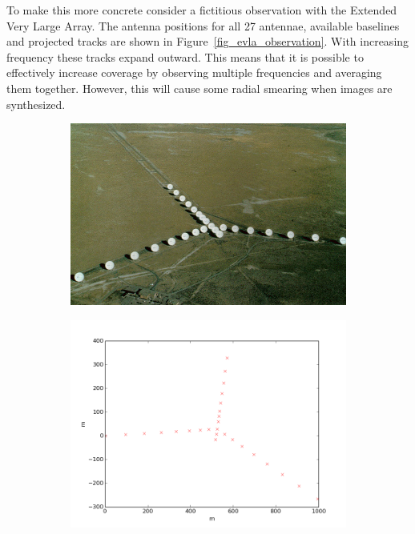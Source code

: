 \documentclass[a4paper,10pt]{report}
\begin{document}
To make this more concrete consider a fictitious observation with the Extended Very Large Array. The antenna 
positions for all 27 antennae, available baselines and projected tracks are shown in Figure~\ref{fig_evla_observation}. With
increasing frequency these tracks expand outward. This means that it is possible to effectively increase coverage
by observing multiple frequencies and averaging them together. However, this will cause some radial smearing when
images are synthesized.

\begin{figure}[h]
 \begin{mdframed}
 \centering
 \begin{subfigure}[b]{0.3\textwidth}
  \includegraphics[width=\textwidth]{images/vla.jpg}
  \caption{}
 \end{subfigure}
 \begin{subfigure}[b]{0.3\textwidth}
  \includegraphics[width=\textwidth]{images/evla_observation/array_config.png}

\end{subfigure}
\end{mdframed}
\end{figure}
\end{document}
